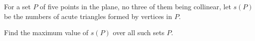 For a set $ P$ of five points in the plane, no three of them being collinear, let $ s(P)$ be the numbers of acute triangles formed by vertices in $ P$.

Find the maximum value of $ s(P)$ over all such sets $ P$.